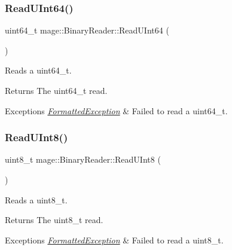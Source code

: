 \subsubsection{\texorpdfstring{Read\+U\+Int64()}{ReadUInt64()}}
{\footnotesize\ttfamily uint64\+\_\+t mage\+::\+Binary\+Reader\+::\+Read\+U\+Int64 (\begin{DoxyParamCaption}{ }\end{DoxyParamCaption})\hspace{0.3cm}{\ttfamily [protected]}}

Reads a {\ttfamily uint64\+\_\+t}.

\begin{DoxyReturn}{Returns}
The {\ttfamily uint64\+\_\+t} read. 
\end{DoxyReturn}

\begin{DoxyExceptions}{Exceptions}
{\em \hyperlink{structmage_1_1_formatted_exception}{Formatted\+Exception}} & Failed to read a {\ttfamily uint64\+\_\+t}. \\
\hline
\end{DoxyExceptions}
\hypertarget{classmage_1_1_binary_reader_af0378b53d82b20ec703e09b325d7a5d2}{}\label{classmage_1_1_binary_reader_af0378b53d82b20ec703e09b325d7a5d2} 
\subsubsection{\texorpdfstring{Read\+U\+Int8()}{ReadUInt8()}}
{\footnotesize\ttfamily uint8\+\_\+t mage\+::\+Binary\+Reader\+::\+Read\+U\+Int8 (\begin{DoxyParamCaption}{ }\end{DoxyParamCaption})\hspace{0.3cm}{\ttfamily [protected]}}

Reads a {\ttfamily uint8\+\_\+t}.

\begin{DoxyReturn}{Returns}
The {\ttfamily uint8\+\_\+t} read. 
\end{DoxyReturn}

\begin{DoxyExceptions}{Exceptions}
{\em \hyperlink{structmage_1_1_formatted_exception}{Formatted\+Exception}} & Failed to read a {\ttfamily uint8\+\_\+t}. \\
\hline
\end{DoxyExceptions}


